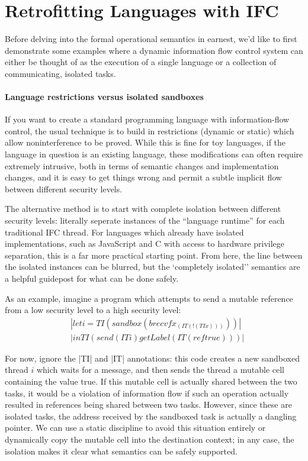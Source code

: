 \section{Retrofitting Languages with IFC}
\label{sec:retrofit}

Before delving into the formal operational semantics in earnest, we'd
like to first demonstrate some examples where a dynamic information flow
control system can either be thought of as the execution of a single
language or a collection of communicating, isolated tasks.


\paragraph{Language restrictions versus isolated sandboxes}  If you want
to create a standard programming language with information-flow control,
the usual technique is to build in restrictions (dynamic or static)
which allow noninterference to be proved.  While this is fine for toy
languages, if the language in question is an existing language, these
modifications can often require extremely intrusive, both in terms of
semantic changes and implementation changes, and it is easy to get things
wrong and permit a subtle implicit flow between different security levels.

The alternative method is to start with complete isolation between
different security levels: literally seperate instances of the
``language runtime'' for each traditional IFC thread.  For languages
which already have isolated implementations, such as JavaScript and C
with access to hardware privilege separation, this is a far more
practical starting point.  From here, the line between the isolated
instances can be blurred, but the `completely isolated'' semantics
are a helpful guidepost for what can be done safely.

As an example, imagine a program which attempts to send a mutable
reference from a low security level to a high security level:
\begin{align*}
    & |let i = TI (sandbox (brecvf x _ (IT (!(TI x)))))|\\
    & |in TI (send (IT i) getLabel (IT (ref true)))|
\end{align*}

For now, ignore the |TI| and |IT| annotations: this code creates a new
sandboxed thread $i$ which waits for a message, and then sends the
thread a mutable cell containing the value true.  If this mutable cell
is actually shared between the two tasks, it would be a violation of
information flow if such an operation actually resulted in references
being shared between two tasks.  However, since these are isolated
tasks, the address received by the sandboxed task is actually a dangling
pointer.  We can use a static discipline to avoid this situation
entirely or dynamically copy the mutable cell into the destination
context; in any case, the isolation makes it clear what semantics can
be safely supported.

